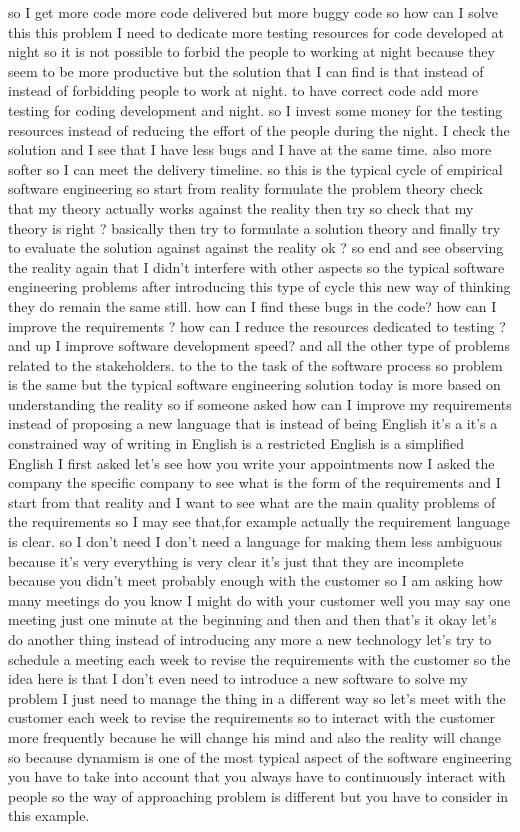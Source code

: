 \documentclass[conference, compsoc, twoside]{IEEEtran}
\begin{document}
so I get more code more code delivered but more buggy code so how can I solve this this problem I need to dedicate more testing resources for code developed at night so it is not possible to forbid the people to working at night because they seem to be more productive but the solution that I can find is that instead of instead of forbidding people to work at night. to have correct code add more testing for coding development and night. 
so I invest some money for the testing resources instead of reducing the effort of the people during the night.
I check the solution and I see that I have less bugs and I have at the same time. also more softer so I can meet the delivery timeline.
so this is the typical cycle of empirical software engineering so start from reality formulate the problem theory check that my theory actually works against the reality then try so check that my theory is right ? 
basically then try to formulate a solution theory and finally try to evaluate the solution against against the reality ok ? so end and see observing the reality again that I didn't interfere with other aspects so the typical software engineering problems after introducing this type of cycle this new way of thinking they do remain the same still. 
how can I find these bugs in the code?
 how can I improve the requirements ?
 how can I reduce the resources dedicated to testing ? 
 and up I improve software development speed? and all the other type of problems related to the stakeholders.
  to the to the task of the software process so problem is the same but the typical software engineering solution today is more based on understanding the reality so if someone asked how can I improve my requirements instead of proposing a new language that is instead of being English it's a it's a constrained way of writing in English is a restricted English is a simplified English I first asked let's see how you write your appointments now I asked the company the specific company to see what is the form of the requirements and I start from that reality and I want to see what are the main quality problems of the requirements 
so I may see that,for example actually the requirement language is clear.
so I don't need I don't need a language for making them less ambiguous because it's very everything is very clear it's just that they are incomplete because you didn't meet probably enough with the customer 
so I am asking how many meetings do you know I might do with your customer well you may say one meeting just one minute at the beginning and then and then that's it okay let's do another thing instead of introducing any more a new technology let's try to schedule a meeting each week to revise the requirements with the customer so the idea here is that I don't even need to introduce a new software to solve my problem I just need to manage the thing in a different way so let's meet with the customer each week to revise the requirements so to interact with the customer more frequently because he will change his mind and also the reality will change so because dynamism is one of the most typical aspect of the software engineering you have to take into account that you always have to continuously interact with people so the way of approaching problem is different but you have to consider in this example.
\end{document}
